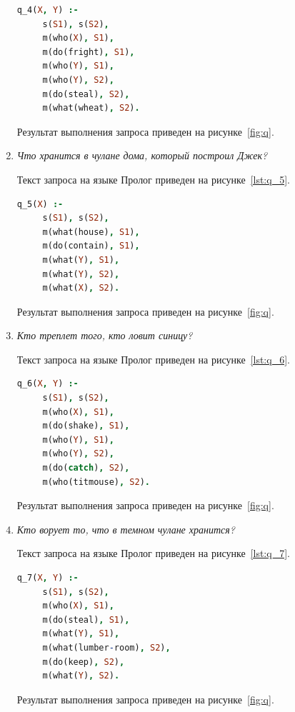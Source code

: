 \begin{enumerate}
  \begin{lstlisting}[style=source_code,language=prolog,
    caption=Текст запроса,label=lst:q_4]
 q_4(X, Y) :-
     s(S1), s(S2),
     m(who(X), S1),
     m(do(fright), S1),
     m(who(Y), S1),
     m(who(Y), S2),
     m(do(steal), S2),
     m(what(wheat), S2).
  \end{lstlisting}

  Результат выполнения запроса приведен на рисунке~\ref{fig:q}.

\newpage

\item \textit{Что хранится в чулане дома, который построил Джек?}

  Текст запроса на языке Пролог приведен на рисунке~\ref{lst:q_5}.

  \begin{lstlisting}[style=source_code,language=prolog,
    caption=Текст запроса,label=lst:q_5]
 q_5(X) :-
     s(S1), s(S2),
     m(what(house), S1),
     m(do(contain), S1),
     m(what(Y), S1),
     m(what(Y), S2),
     m(what(X), S2).
  \end{lstlisting}

  Результат выполнения запроса приведен на рисунке~\ref{fig:q}.

\item \textit{Кто треплет того, кто ловит синицу?}

  Текст запроса на языке Пролог приведен на рисунке~\ref{lst:q_6}.

  \begin{lstlisting}[style=source_code,language=prolog,
    caption=Текст запроса,label=lst:q_6]
 q_6(X, Y) :-
     s(S1), s(S2),
     m(who(X), S1),
     m(do(shake), S1),
     m(who(Y), S1),
     m(who(Y), S2),
     m(do(catch), S2),
     m(who(titmouse), S2).
  \end{lstlisting}

  Результат выполнения запроса приведен на рисунке~\ref{fig:q}.

\newpage

\item \textit{Кто ворует то, что в темном чулане хранится?}

  Текст запроса на языке Пролог приведен на рисунке~\ref{lst:q_7}.

  \begin{lstlisting}[style=source_code,language=prolog,
    caption=Текст запроса,label=lst:q_7]
 q_7(X, Y) :-
     s(S1), s(S2),
     m(who(X), S1),
     m(do(steal), S1),
     m(what(Y), S1),
     m(what(lumber-room), S2),
     m(do(keep), S2),
     m(what(Y), S2).
  \end{lstlisting}

  Результат выполнения запроса приведен на рисунке~\ref{fig:q}.

\end{enumerate}

